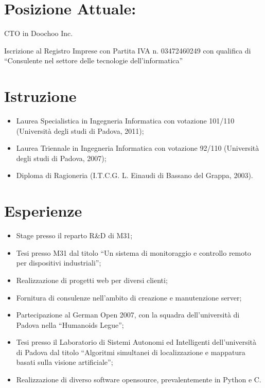\documentclass[pdftex, a4paper, 11pt]{article}
\begin{document}
\section*{Posizione Attuale:}


CTO in Doochoo Inc.

Iscrizione al Registro Imprese con Partita IVA n. 03472460249 con qualifica di ``Consulente nel settore delle tecnologie dell'informatica''


\section*{Istruzione}
\begin{itemize}
\item Laurea Specialistica in Ingegneria Informatica con votazione 101/110 (Universit\`a degli studi di Padova, 2011);
\item Laurea Triennale in Ingegneria Informatica con votazione 92/110 (Universit\`a degli
  studi di Padova, 2007);
\item Diploma di Ragioneria (I.T.C.G. L. Einaudi di Bassano del Grappa,
  2003).
\end{itemize}

\section*{Esperienze}
\begin{itemize}
\item Stage presso il reparto R\&D di M31;
\item Tesi presso M31 dal titolo ``Un sistema di monitoraggio e controllo remoto per dispositivi industriali'';
\item Realizzazione di progetti web per diversi clienti;
\item Fornitura di consulenze nell'ambito di creazione e manutenzione server;
\item Partecipazione al German Open 2007, con la squadra
  dell'universit\`a di Padova nella ``Humanoids Legue'';
\item Tesi presso il Laboratorio di Sistemi Autonomi ed
  Intelligenti dell'universit\`a di Padova dal titolo ``Algoritmi
  simultanei di localizzazione e mappatura basati sulla visione artificiale'';
\item Realizzazione di diverso software opensource,
  prevalentemente in Python e C.
\end{itemize}
\end{document}
